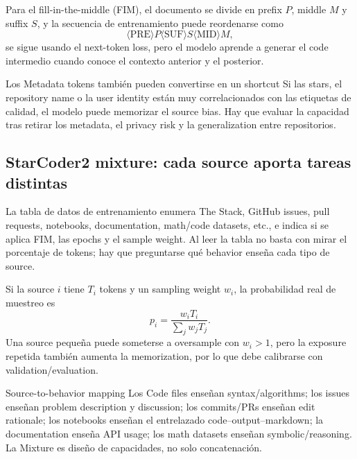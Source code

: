 

Para el fill-in-the-middle (FIM), el documento se divide en prefix $P$, middle $M$ y suffix $S$, y la secuencia de entrenamiento puede reordenarse como
\[
\langle\text{PRE}\rangle P\langle\text{SUF}\rangle S
\langle\text{MID}\rangle M,
\]
se sigue usando el next-token loss, pero el modelo aprende a generar el code intermedio cuando conoce el contexto anterior y el posterior.

\begin{warningbox}{Los Metadata tokens también pueden convertirse en un shortcut}
Si las stars, el repository name o la user identity están muy correlacionados con las etiquetas de calidad, el modelo puede memorizar el source bias. Hay que evaluar la capacidad tras retirar los metadata, el privacy risk y la generalization entre repositorios.
\end{warningbox}

\subsection{StarCoder2 mixture: cada source aporta tareas distintas}

La tabla de datos de entrenamiento enumera The Stack, GitHub issues, pull requests, notebooks, documentation, math/code datasets, etc., e indica si se aplica FIM, las epochs y el sample weight. Al leer la tabla no basta con mirar el porcentaje de tokens; hay que preguntarse qué behavior enseña cada tipo de source.


Si la source $i$ tiene $T_i$ tokens y un sampling weight $w_i$, la probabilidad real de muestreo es
\[
p_i=\frac{w_iT_i}{\sum_j w_jT_j}.
\]
Una source pequeña puede someterse a oversample con $w_i>1$, pero la exposure repetida también aumenta la memorization, por lo que debe calibrarse con validation/evaluation.

\begin{knowledgebox}{Source-to-behavior mapping}
Los Code files enseñan syntax/algorithms; los issues enseñan problem description y discussion; los commits/PRs enseñan edit rationale; los notebooks enseñan el entrelazado code--output--markdown; la documentation enseña API usage; los math datasets enseñan symbolic/reasoning. La Mixture es diseño de capacidades, no solo concatenación.
\end{knowledgebox}

